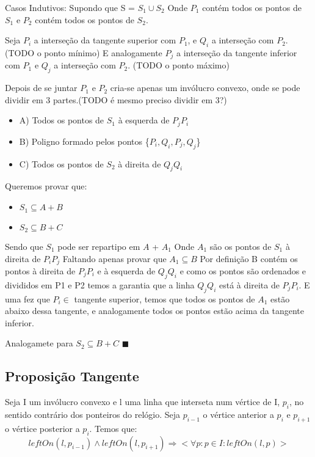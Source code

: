 \documentclass[11pt]{article}
\begin{document}
Casos Indutivos:
\newline
Supondo que S = $S_1 \cup S_2$ 
\newline
Onde $P_1$ contém todos os pontos de $S_1$ e $P_2$ contém todos os pontos
de $S_2$.
\newline

Seja $P_i$ a interseção da tangente superior com $P_1$, e $Q_i$ a interseção 
com $P_2$.(TODO o ponto mínimo)
E analogamente $P_j$ a interseção da tangente inferior com $P_1$
e $Q_j$ a interseção com $P_2$. (TODO o ponto máximo)

Depois de se juntar $P_1$ e $P_2$ cria-se apenas um invólucro convexo,
onde se pode dividir em 3 partes.(TODO é mesmo preciso dividir em 3?)

\begin{itemize}
    \item A) Todos os pontos de $S_1$ à esquerda de $P_jP_i$
    \item B) Poligno formado pelos pontos \{$P_i,Q_i,P_j,Q_j$\}
    \item C) Todos os pontos de $S_2$ à direita de $Q_jQ_i$
\end{itemize}

Queremos provar que:
\begin{itemize}
    \item $S_1 \subseteq A + B$
    \item $S_2 \subseteq B + C$
\end{itemize}

Sendo que $S_1$ pode ser repartipo em $A$ + $A_1$
\newline
Onde $A_1$ são os pontos de $S_1$ à direita de $P_iP_j$
\newline
Faltando apenas provar que $A_1 \subseteq B$ 
Por definição B contém os pontos à direita de $P_jP_i$ e à esquerda
de $Q_jQ_i$ e como os pontos são ordenados e divididos em P1 e P2
temos a garantia que a linha $Q_jQ_i$ está à direita de $P_jP_i$.
E uma fez que $P_i \in$ tangente superior, temos que todos os pontos
de $A_1$ estão abaixo dessa tangente, e analogamente todos os pontos
estão acima da tangente inferior.


Analogamete para $S_2 \subseteq B + C$
\hfill $\blacksquare$

\subsection{Proposição Tangente}
Seja 
    I um invólucro convexo e 
    l uma linha que interseta num vértice de I, $p_i$,
no sentido contrário dos ponteiros do relógio.
Seja $p_{i-1}$ o vértice anterior a $p_i$ e $p_{i+1}$ o vértice posterior a $p_i$.
Temos que:
$$leftOn(l, p_{i-1}) \wedge leftOn(l, p_{i+1}) \Rightarrow
    <\forall p : p \in I : leftOn(l, p)>$$
\end{document}
